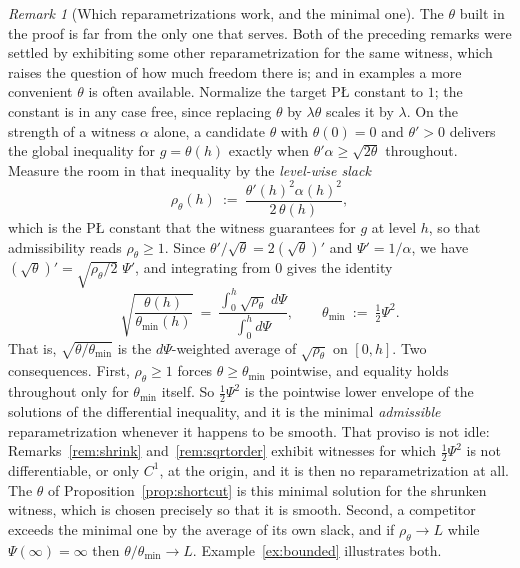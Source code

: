 \documentclass[11pt]{article}
\theoremstyle{plain}
\theoremstyle{definition}
\theoremstyle{remark}
\newtheorem{rem}[thm]{Remark}
\begin{document}
\begin{rem}[Which reparametrizations work, and the minimal one]\label{rem:minimal}
The $\theta$ built in the proof is far from the only one that serves. Both of the
preceding remarks were settled by exhibiting some other reparametrization for the
same witness, which raises the question of how much freedom there is; and in
examples a more convenient $\theta$ is often available. Normalize the target
P\L{} constant to $1$; the constant is in any
case free, since replacing $\theta$ by $\lambda\theta$ scales it by $\lambda$. On the
strength of a witness $\alpha$ alone, a candidate $\theta$ with $\theta(0)=0$ and
$\theta'>0$ delivers the global inequality for $g=\theta(h)$ exactly when
$\theta'\alpha\ge\sqrt{2\theta}$ throughout. Measure the room in that inequality by
the \emph{level-wise slack}
\[
  \rho_\theta(h) \ :=\ \frac{\theta'(h)^2\alpha(h)^2}{2\,\theta(h)} ,
\]
which is the P\L{} constant that the witness guarantees for $g$ at level $h$, so that
admissibility reads $\rho_\theta\ge1$. Since $\theta'/\sqrt\theta = 2(\sqrt\theta)'$
and $\Psi'=1/\alpha$, we have $(\sqrt\theta)' = \sqrt{\rho_\theta/2}\;\Psi'$, and
integrating from $0$ gives the identity
\begin{equation}\label{eq:average}
  \sqrt{\frac{\theta(h)}{\theta_{\min}(h)}}
  \ =\ \frac{\int_0^h\sqrt{\rho_\theta}\;d\Psi}{\int_0^h d\Psi} ,
  \qquad \theta_{\min} \ :=\ \tfrac12\Psi^2 .
\end{equation}
That is, $\sqrt{\theta/\theta_{\min}}$ is the $d\Psi$-weighted average of
$\sqrt{\rho_\theta}$ on $[0,h]$. Two consequences. First, $\rho_\theta\ge1$ forces
$\theta\ge\theta_{\min}$ pointwise, and equality holds throughout only for
$\theta_{\min}$ itself. So $\tfrac12\Psi^2$ is the pointwise lower envelope of the
solutions of the differential inequality, and it is the minimal \emph{admissible}
reparametrization whenever it happens to be smooth. That proviso is not idle:
Remarks~\ref{rem:shrink} and~\ref{rem:sqrtorder} exhibit witnesses for which
$\tfrac12\Psi^2$ is not differentiable, or only $C^1$, at the origin, and it is then
no reparametrization at all. The $\theta$ of Proposition~\ref{prop:shortcut} is this
minimal solution for the shrunken witness, which is chosen precisely so that it is
smooth. Second, a competitor exceeds the minimal one by the average
of its own slack, and if $\rho_\theta\to L$ while $\Psi(\infty)=\infty$ then
$\theta/\theta_{\min}\to L$. Example~\ref{ex:bounded} illustrates both.
\end{rem}
\end{document}
